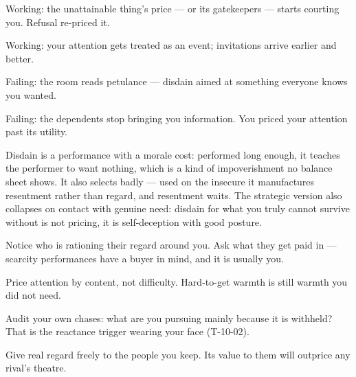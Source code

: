 \begin{feedback}
  \item Working: the unattainable thing's price --- or its gatekeepers --- starts courting you. Refusal re-priced it.
  \item Working: your attention gets treated as an event; invitations arrive earlier and better.
  \item Failing: the room reads petulance --- disdain aimed at something everyone knows you wanted.
  \item Failing: the dependents stop bringing you information. You priced your attention past its utility.
\end{feedback}
\begin{failure}
Disdain is a performance with a morale cost: performed long enough, it teaches the performer to want nothing, which is a kind of impoverishment no balance sheet shows. It also selects badly --- used on the insecure it manufactures resentment rather than regard, and resentment waits. The strategic version also collapses on contact with genuine need: disdain for what you truly cannot survive without is not pricing, it is self-deception with good posture.
\end{failure}
\begin{countermeasures}
  \item Notice who is rationing their regard around you. Ask what they get paid in --- scarcity performances have a buyer in mind, and it is usually you.
  \item Price attention by content, not difficulty. Hard-to-get warmth is still warmth you did not need.
  \item Audit your own chases: what are you pursuing mainly because it is withheld? That is the reactance trigger wearing your face (T-10-02).
  \item Give real regard freely to the people you keep. Its value to them will outprice any rival's theatre.
\end{countermeasures}

\seesources
{}
